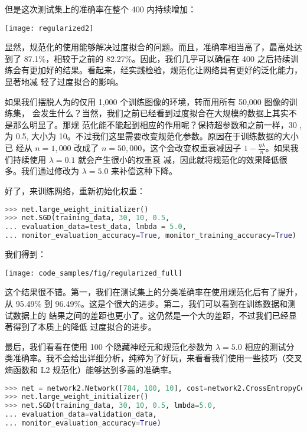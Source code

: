 但是这次测试集上的准确率在整个 400 \epochs{}内持续增加：
\begin{center}
  \texttt{[image: regularized2]}
\end{center}

显然，规范化的使用能够解决过度拟合的问题。而且，准确率相当高了，最高处达到了
87.1\%，相较于之前的 82.27\%。因此，我们几乎可以确信在 400 \epochs{}之后持续训
练会有更加好的结果。看起来，经实践检验，规范化让网络具有更好的泛化能力，显著地减
轻了过度拟合的影响。

如果我们摆脱人为的仅用 1,000 个训练图像的环境，转而用所有 50,000 图像的训练集，
会发生什么？当然，我们之前已经看到过度拟合在大规模的数据上其实不是那么明显了。那规
范化能不能起到相应的作用呢？保持超参数和之前一样，30 \epochs{}, \learningrate{}为 0.5,
\minibatch{}大小为 10。不过我们这里需要改变规范化参数。原因在于训练数据的大小已
经从 $n=1,000$ 改成了 $n=50,000$，这个会改变权重衰减因子
$1-\frac{\eta\lambda}{n}$。如果我们持续使用 $\lambda = 0.1$ 就会产生很小的权重衰
减，因此就将规范化的效果降低很多。我们通过修改为 $\lambda = 5.0$ 来补偿这种下降。

好了，来训练网络，重新初始化权重：

\begin{lstlisting}[language=Python]
>>> net.large_weight_initializer()
>>> net.SGD(training_data, 30, 10, 0.5,
... evaluation_data=test_data, lmbda = 5.0,
... monitor_evaluation_accuracy=True, monitor_training_accuracy=True)
\end{lstlisting}

我们得到：
\begin{center}
  \texttt{[image: code\_samples/fig/regularized\_full]}
\end{center}

这个结果很不错。第一，我们在测试集上的分类准确率在使用规范化后有了提升，从
95.49\% 到 96.49\%。这是个很大的进步。第二，我们可以看到在训练数据和测试数据上的
结果之间的差距也更小了。这仍然是一个大的差距，不过我们已经显著得到了本质上的降低
过度拟合的进步。

最后，我们看看在使用 100 个隐藏神经元和规范化参数为 $\lambda = 5.0$ 相应的测试分
类准确率。我不会给出详细分析，纯粹为了好玩，来看看我们使用一些技巧（交叉熵函数和
  L2 规范化）能够达到多高的准确率。

\begin{lstlisting}[language=Python]
>>> net = network2.Network([784, 100, 10], cost=network2.CrossEntropyCost)
>>> net.large_weight_initializer()
>>> net.SGD(training_data, 30, 10, 0.5, lmbda=5.0,
... evaluation_data=validation_data,
... monitor_evaluation_accuracy=True)
\end{lstlisting}

